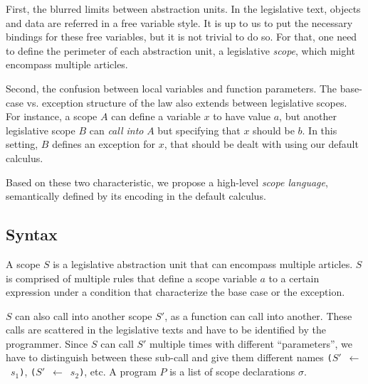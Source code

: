 \documentclass[11pt,a4paper]{article}
\newcommand{\synvar}[1]{\ensuremath{#1}}
\newcommand{\synpunct}[1]{\textcolor{black!40!white}{\texttt{#1}}}
\newcommand{\synlparen}{\synpunct{(}}
\newcommand{\synrparen}{\synpunct{)}}
\newcommand{\synlarrow}{~\synpunct{$\leftarrow$}~}
\begin{document}
First, the blurred limits between abstraction units.
In the legislative text, objects and data are referred in a free variable style.
It is up to us to put the necessary bindings for these free variables, but 
it is not trivial to do so. For that, one need to define the perimeter of 
each abstraction unit, a legislative \emph{scope}, which might encompass multiple 
articles.

Second, the confusion between local variables and function parameters. The 
base-case vs. exception structure of the law also extends between legislative 
scopes. For instance, a scope $A$ can define a variable $x$ to have value $a$, but 
another legislative scope $B$ can \emph{call into} $A$ but specifying that 
$x$ should be $b$. In this setting, $B$ defines an exception for $x$, that 
should be dealt with using our default calculus.

Based on these two characteristic, we propose a high-level \emph{scope language},
semantically defined by its encoding in the default calculus.

\subsection{Syntax}

A scope $S$ is a legislative abstraction unit that can encompass multiple 
articles. $S$ is comprised of multiple rules that define a scope variable $a$ 
to a certain expression under a condition that characterize the base case or 
the exception.

$S$ can also call into another scope $S'$, as a function can call 
into another. These calls are scattered in the legislative texts and have 
to be identified by the programmer. Since $S$ can call $S'$ multiple times
with different \enquote{parameters}, we have to distinguish between these
sub-call and give them different names \synlparen\synvar{S'}\synlarrow\synvar{s_1}\synrparen,
 \synlparen\synvar{S'}\synlarrow\synvar{s_2}\synrparen, etc. A program $P$ is 
 a list of scope declarations $\sigma$.
\end{document}
